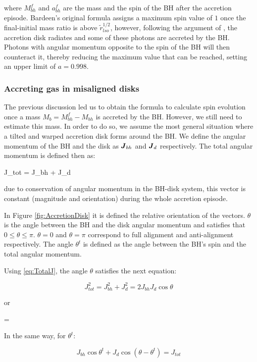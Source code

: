 \documentclass[a4,useAMS,usenatbib,usegraphicx,12pt]{article}
\begin{document}
where $M^f_{bh}$ and $a^f_{bh}$ are the mass and the spin of the BH after the accretion episode. 
Bardeen's original formula assigns a maximum spin value of $1$ once the final-initial mass ratio is 
above $\tilde{r}_{lso}^{1/2}$, however, following the argument of \citet{Thorne1974}, the accretion 
disk radiates and some of these photons are accreted by the BH. Photons with angular momentum 
opposite to the spin of the BH will then counteract it, thereby reducing the maximum value that can 
be reached, setting an upper limit of $a = 0.998$.

\subsubsection{Accreting gas in misaligned disks}

The previous discussion led us to obtain the formula to calculate spin evolution once a mass $M_b = 
M^f_{bh} - M_{bh}$ is accreted by the BH. However, we still need to estimate this mass. In order to 
do so, we assume the most general situation where a tilted and warped accretion disk forms around
the BH. We define the angular momentum of the BH and the disk as $\boldsymbol{ J }_{bh}$ and $\boldsymbol{ J }_{d}$
respectively. The total angular momentum is defined then as:

{ \bds J_{tot} = \bds J_{bh} + \bds J_{d} }


due to conservation of angular momentum in the BH-disk system, this vector is constant (magnitude
and orientation) during the whole accretion episode.

In Figure \ref{fig:AccretionDisk} it is defined the relative orientation of the vectors. $\theta$ is 
the angle between the BH and the disk angular momentum and satisfies that $0\leq \theta \leq \pi$.
$\theta = 0$ and $\theta = \pi$ correspond to full alignment and anti-alignment respectively. The 
angle $\theta^t$ is defined as the angle between the BH's spin and the total angular momentum.

Using \ref{eq:TotalJ}, the angle $\theta$ satisfies the next equation:

\[ J^2_{tot} = J^2_{bh} + J^2_{d} = 2J_{bh}J_{d}\cos \theta \]

or

{ \cos\theta =  }

In the same way, for $\theta^t$:

\[ J_{bh}\cos\theta^t + J_d\cos(\theta - \theta^t) = J_{tot} \]
\end{document}
